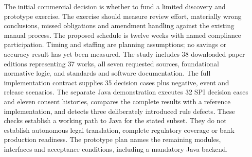 \documentclass[11pt,a4paper]{article}
\begin{document}
The initial commercial decision is whether to fund a limited discovery and
prototype exercise.
The exercise should measure review effort, materially wrong conclusions, missed
obligations and amendment handling against the existing manual process. The
proposed schedule is twelve weeks with named compliance participation. Timing and
staffing are planning assumptions; no savings or accuracy result has yet been
measured. The study includes 38 downloaded paper editions representing 37 works,
all seven requested sources, foundational normative logic, and standards and
software documentation. The full implementation contract supplies 35 decision
cases plus negative, event and release scenarios. The separate Java demonstration
executes 32 SPI decision cases and eleven consent histories, compares the complete
results with a reference implementation, and detects three deliberately
introduced rule defects. These checks establish a working path to Java for the
stated subset. They do not establish autonomous legal translation, complete
regulatory coverage or bank production readiness. The prototype plan names the
remaining modules, interfaces and acceptance conditions, including a mandatory
Java backend.

\clearpage
\begingroup
\small
\setlength{\parskip}{0pt}
\tableofcontents
\endgroup
\clearpage








\clearpage
\begingroup
\raggedright


\endgroup
\end{document}
